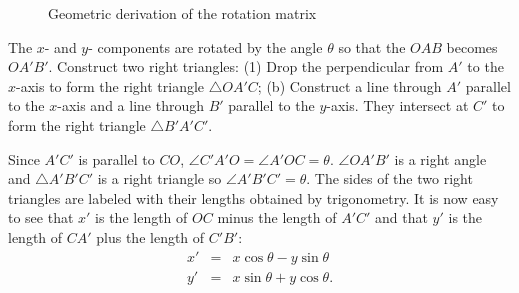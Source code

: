 \documentclass[11pt,a4paper]{report}
\begin{document}
\begin{figure}
\begin{center}
\caption{Geometric derivation of the rotation matrix}\label{fig.geo}
\end{center}
\end{figure}

The $x$- and $y$- components are rotated by the angle $\theta$ so that the $OAB$ becomes $OA'B'$. Construct two right triangles: (1) Drop the perpendicular from $A'$ to the $x$-axis to form the right triangle $\triangle OA'C$; (b) Construct a line through $A'$ parallel to the $x$-axis and a line through $B'$ parallel to the $y$-axis. They intersect at $C'$ to form the right triangle $\triangle B'A'C'$.

Since $A'C'$ is parallel to $CO$, $\angle C'A'O = \angle A'OC = \theta$. $\angle OA'B'$ is a right angle and $\triangle A'B'C'$ is a right triangle so $\angle A'B'C' = \theta$. The sides of the two right triangles are labeled with their lengths obtained by trigonometry. It is now easy to see that $x'$ is the length of $OC$ minus the length of $A'C'$ and that $y'$ is the length of $CA'$ plus the length of $C'B'$:
\begin{eqnarray*}
x' &=& x \cos\theta - y \sin\theta\\
y' &=& x \sin\theta + y \cos\theta.
\end{eqnarray*}
\end{document}
